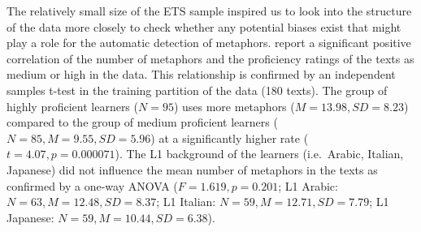 \documentclass[11pt,a4paper]{article}
\begin{document}
The relatively small size of the ETS sample inspired us to look into the structure of the data more closely to check whether any potential biases exist that might play a role for the automatic detection of metaphors. \citet[p.89]{beigmanklebanov-EtAl:2018} report a significant positive correlation of the number of metaphors and the proficiency ratings of the texts as medium or high in the data. This relationship is confirmed by an independent samples t-test in the training partition of the data (180 texts). The group of highly proficient learners ($N=95$) uses more metaphors ($M=13.98, SD=8.23$) compared to the group of medium proficient learners ($N=85, M=9.55, SD=5.96$) at a significantly higher rate ($t=4.07, p=0.000071$). The L1 background of the learners (i.e.~Arabic, Italian, Japanese) did not influence the mean number of metaphors in the texts as confirmed by a one-way ANOVA ($F=1.619, p=0.201$; L1 Arabic: $N=63, M=12.48, SD=8.37$; L1 Italian: $N=59, M=12.71, SD=7.79$; L1 Japanese: $N=59, M=10.44, SD=6.38$). 
\end{document}
